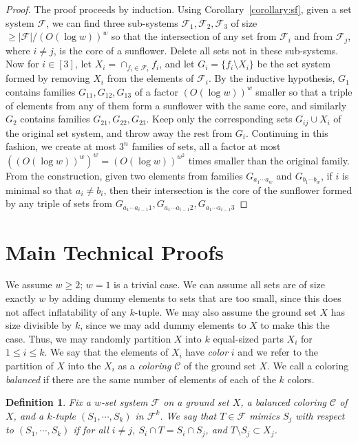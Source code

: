\documentclass[12pt]{article}
\newtheorem{definition}[theorem]{Definition}
\newcommand{\F}{\mathcal{F}}
\newcommand{\C}{\mathcal{C}}
\begin{document}
\begin{proof}
	The proof proceeds by induction.  Using Corollary~\ref{corollary:sf}, given a set system $\F$, we can find three sub-systems $\F_1, \F_2, \F_3$ of size $ \ge |\F|/(O(\log w))^w$ so that the intersection of any set from $\F_i$ and from $\F_j$, where $i \neq j$, is the core of a sunflower.  Delete all sets not in these sub-systems.  Now for $i \in [3]$, let $X_i=\cap_{f_i \in \F_i}f_i$, and let $G_i=\{f_i \setminus X_i\}$ be the set system formed by removing $X_i$ from the elements of $\F_i$.  By the inductive hypothesis, $G_1$ contains families $G_{11}, G_{12}, G_{13}$ of a factor $(O(\log w))^w$ smaller so that a triple of elements from any of them form a sunflower with the same core, and similarly $G_2$ contains families $G_{21}, G_{22}, G_{23}$.  Keep only the corresponding sets $G_{ij} \cup X_i$ of the original set system, and throw away the rest from $G_i$.  Continuing in this fashion, we create at most $3^n$ families of sets, all a factor at most $((O(\log w))^w)^w=(O(\log w))^{w^2}$ times smaller than the original family.  From the construction, given two elements from families $G_{a_1 \cdots a_w}$ and $G_{b_1 \cdots b_w}$, if $i$ is minimal so that $a_i \neq b_i$, then their intersection is the core of the sunflower formed by any triple of sets from $G_{a_1 \cdots a_{i-1}1}, G_{a_1 \cdots a_{i-1}2}, G_{a_1 \cdots a_{i-1}3}$
	\end{proof}
	
	\fi
	
\section{Main Technical Proofs}
\label{s2}

We assume $w \ge 2$; $w=1$ is a trivial case. We can assume all sets are of size exactly $w$ by adding dummy elements to sets that are too small, since this does not affect inflatability of any $k$-tuple. We may also assume the ground set $X$ has size divisible by $k$, since we may add dummy elements to $X$ to make this the case. Thus, we may randomly partition $X$ into $k$ equal-sized parts $X_i$ for $1 \le i \le k$.  We say that the elements of $X_i$ have \emph{color} $i$ and we refer to the partition of $X$ into the $X_i$ as a \emph{coloring} $\C$ of the ground set $X$.  We call a coloring \emph{balanced} if there are the same number of elements of each of the $k$ colors.
	
\begin{definition}
Fix a $w$-set system $\F$ on a ground set $X$, a balanced coloring $\C$ of $X$, and a $k$-tuple $(S_1, \cdots, S_k)$ in $\F^k$. We say that $T \in \F$ \emph{mimics $S_j$ with respect to $(S_1, \cdots, S_k)$} if for all $i \neq j$, $S_i \cap T=S_i \cap S_j$, and $T \setminus S_j \subset X_j$.
\end{definition}
\end{document}
